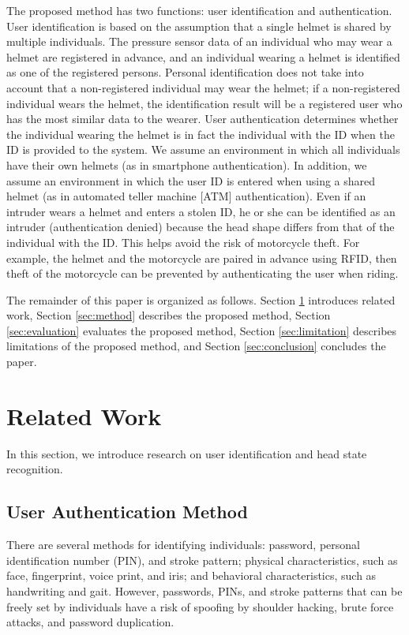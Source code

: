 \documentclass[english,preprint,JIP]{ipsj}
\begin{document}
The proposed method has two functions: user identification and authentication. User identification is based on the assumption that a single helmet is shared by multiple individuals. The pressure sensor data of an individual who may wear a helmet are registered in advance, and an individual wearing a helmet is identified as one of the registered persons. Personal identification does not take into account that a non-registered individual may wear the helmet; if a non-registered individual wears the helmet, the identification result will be a registered user who has the most similar data to the wearer. User authentication determines whether the individual wearing the helmet is in fact the individual with the ID when the ID is provided to the system. We assume an environment in which all individuals have their own helmets (as in smartphone authentication). In addition, we assume an environment in which the user ID is entered when using a shared helmet (as in automated teller machine [ATM] authentication). Even if an intruder wears a helmet and enters a stolen ID, he or she can be identified as an intruder (authentication denied) because the head shape differs from that of the individual with the ID. This helps avoid the risk of motorcycle theft. For example, the helmet and the motorcycle are paired in advance using RFID\cite{RFID}, then theft of the motorcycle can be prevented by authenticating the user when riding.\par

The remainder of this paper is organized as follows. Section \ref{sec:related} introduces related work, Section \ref{sec:method} describes the proposed method, Section \ref{sec:evaluation} evaluates the proposed method, Section \ref{sec:limitation} describes limitations of the proposed method, and Section \ref{sec:conclusion} concludes the paper.



\section{Related Work}
\label{sec:related}
In this section, we introduce research on user identification and head state recognition.


\subsection{User Authentication Method}
There are several methods for identifying individuals: password, personal identification number (PIN), and stroke pattern; physical characteristics, such as face, fingerprint, voice print, and iris; and behavioral characteristics, such as handwriting and gait. However, passwords, PINs, and stroke patterns that can be freely set by individuals have a risk of spoofing by shoulder hacking, brute force attacks, and password duplication.\par
\end{document}
